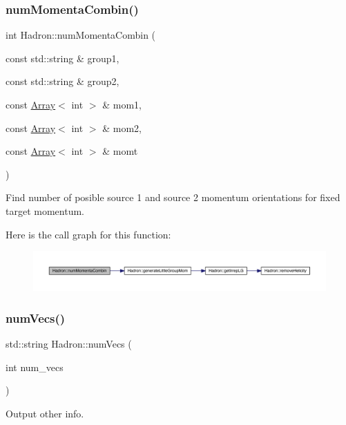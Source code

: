 \subsubsection{\texorpdfstring{numMomentaCombin()}{numMomentaCombin()}}
{\footnotesize\ttfamily int Hadron\+::num\+Momenta\+Combin (\begin{DoxyParamCaption}\item[{const std\+::string \&}]{group1,  }\item[{const std\+::string \&}]{group2,  }\item[{const \mbox{\hyperlink{classXMLArray_1_1Array}{Array}}$<$ int $>$ \&}]{mom1,  }\item[{const \mbox{\hyperlink{classXMLArray_1_1Array}{Array}}$<$ int $>$ \&}]{mom2,  }\item[{const \mbox{\hyperlink{classXMLArray_1_1Array}{Array}}$<$ int $>$ \&}]{momt }\end{DoxyParamCaption})}



Find number of posible source 1 and source 2 momentum orientations for fixed target momentum. 

Here is the call graph for this function\+:
\nopagebreak
\begin{figure}[H]
\begin{center}
\leavevmode
\includegraphics[width=350pt]{d1/daf/namespaceHadron_afc213211f9c79372b449aac381596d1c_cgraph}
\end{center}
\end{figure}
\mbox{\label{namespaceHadron_afea9ddb2112da9cb61d87881799fff49}} 
\subsubsection{\texorpdfstring{numVecs()}{numVecs()}}
{\footnotesize\ttfamily std\+::string Hadron\+::num\+Vecs (\begin{DoxyParamCaption}\item[{int}]{num\+\_\+vecs }\end{DoxyParamCaption})}



Output other info. 


